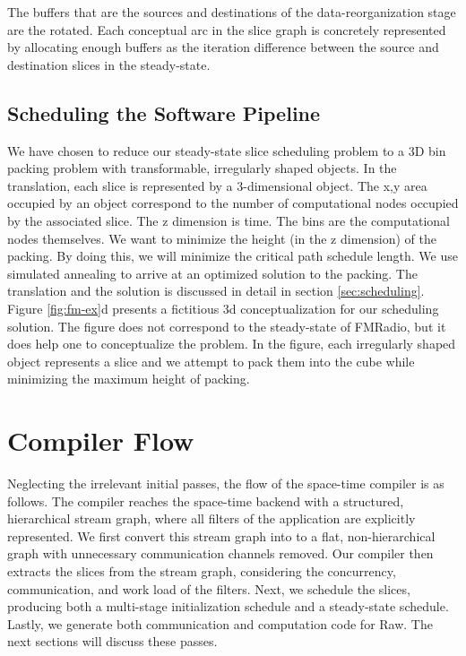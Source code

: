 The buffers that are the sources and destinations of the
data-reorganization stage are the rotated.  Each conceptual arc in the
slice graph is concretely represented by allocating enough buffers as
the iteration difference between the source and destination slices in
the steady-state.

\subsection{Scheduling the Software Pipeline}
We have chosen to reduce our steady-state slice scheduling problem to
a 3D bin packing problem \cite{binpacking} with transformable,
irregularly shaped objects.  In the translation, each slice is
represented by a 3-dimensional object.  The x,y area occupied by an
object correspond to the number of computational nodes occupied by the
associated slice. The z dimension is time.  The bins are the
computational nodes themselves.  We want to minimize the height (in
the z dimension) of the packing.  By doing this, we will minimize the
critical path schedule length.  We use simulated annealing to arrive
at an optimized solution to the packing.  The translation and the
solution is discussed in detail in section
\ref{sec:scheduling}. Figure
\ref{fig:fm-ex}d presents a fictitious 3d conceptualization for
our scheduling solution.  The figure does not correspond to the
steady-state of FMRadio, but it does help one to conceptualize the
problem. In the figure, each irregularly shaped object represents a
slice and we attempt to pack them into the cube while minimizing the
maximum height of packing.

\section{Compiler Flow}
Neglecting the irrelevant initial passes, the flow of the space-time
compiler is as follows.  The compiler reaches the space-time backend
with a structured, hierarchical stream graph, where all filters of the
application are explicitly represented.  We first convert this stream
graph into to a flat, non-hierarchical graph with unnecessary
communication channels removed.  Our compiler then extracts the
slices from the stream graph, considering the concurrency,
communication, and work load of the filters.
Next, we schedule the slices, producing both a multi-stage
initialization schedule and a steady-state schedule.  Lastly, we
generate both communication and computation code for Raw.  The next
sections will discuss these passes.